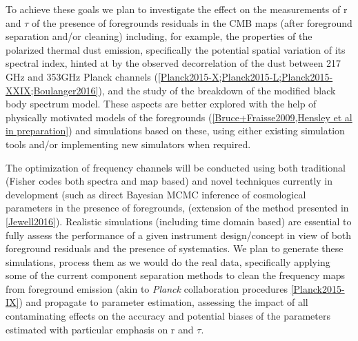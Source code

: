 To achieve these goals we plan to investigate the effect on the measurements of r and $\tau$ of the presence of foregrounds residuals in the CMB maps (after foreground separation and/or cleaning) including, for example, the properties of the polarized thermal dust emission, specifically the potential spatial variation of its spectral index, hinted at by the observed decorrelation of the dust between 217 GHz and 353GHz Planck channels (\ref{Planck2015-X;Planck2015-L;Planck2015-XXIX;Boulanger2016}), and the study of the breakdown of the modified black body spectrum model. 
These aspects are better explored with the help of physically motivated models of the foregrounds (\ref{Bruce+Fraisse2009,Hensley et al in preparation}) and simulations based on these, using either existing simulation tools and/or implementing new simulators when required. 

The optimization of frequency channels will be conducted using both traditional (Fisher codes both spectra and map based) and novel techniques currently in development (such as direct Bayesian MCMC inference of cosmological parameters in the presence of foregrounds, (extension of the method presented in  \ref{Jewell2016}). Realistic simulations (including time domain based) are essential to fully assess the performance of a given instrument design/concept in view of both foreground residuals and the presence of systematics. We plan to generate these simulations, process them as we would do the real data, specifically applying some of the current component separation methods to clean the frequency maps from foreground emission (akin to {\it Planck} collaboration procedures \ref{Planck2015-IX}) and propagate to parameter estimation, assessing the impact of all contaminating effects on the accuracy and potential biases of the parameters estimated with particular emphasis on r and $\tau$.



%





